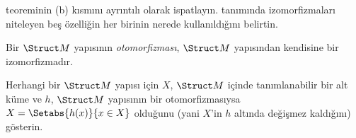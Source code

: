 \begin{prob}
 teoreminin (b) kısmını ayrıntılı olarak
ispatlayın.  tanımında
izomorfizmaları niteleyen beş özelliğin her birinin nerede
kullanıldığını belirtin.
\end{prob}

\begin{defn}
Bir $\Struct M$ yapısının \emph{otomorfizması}, $\Struct M$ yapısından
kendisine bir izomorfizmadır.
\end{defn}

\begin{prob}
Herhangi bir $\Struct M$ yapısı için $X$, $\Struct M$ içinde
tanımlanabilir bir alt küme ve $h$, $\Struct M$ yapısının bir
otomorfizmasıysa $X=\Setabs{h(x)}{x\in X}$ olduğunu (yani $X$'in $h$
altında değişmez kaldığını) gösterin.
\end{prob}


